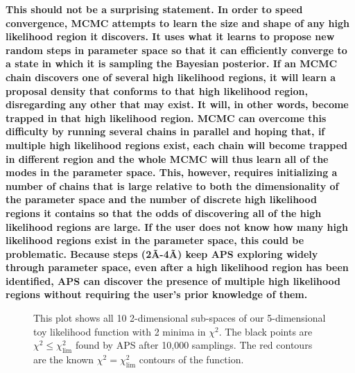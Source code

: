 \documentclass[useAMS,usenatbib]{aastex}
\begin{document}
{\bf %
This should not be a surprising statement.  In order to speed convergence,
MCMC attempts to learn the size and shape of any high likelihood region it discovers.
It uses what it learns to propose new random steps in parameter space so that it can
efficiently converge to a state in which it is sampling the Bayesian posterior.  If
an MCMC chain discovers one of several high likelihood regions, it will learn a proposal
density that conforms to that high likelihood region, disregarding any other that may
exist.  It will, in other words, become trapped in that high likelihood region.
MCMC can overcome this difficulty by running several chains in parallel and hoping that,
if multiple high likelihood regions exist, each chain will become trapped in different
region and the whole MCMC will thus learn all of the modes in the parameter space.
This, however, requires initializing a number of chains that is large relative to both
the dimensionality of the parameter space and the number of discrete high likelihood
regions it contains so that the odds of discovering all of the high likelihood regions
are large.  If the user does not know how many high likelihood regions exist in
the parameter space, this could be problematic.  Because steps (2\~A-4\~A) keep APS
exploring widely through parameter space, even after a high likelihood region has been
identified, APS can discover the presence of
multiple high likelihood regions without requiring the user's prior knowledge of them.
}%

\begin{figure*}
\caption{
This plot shows all 10 2-dimensional sub-spaces of our 5-dimensional toy likelihood
function with 2 minima in $\chi^2$.  The black points are $\chi^2\le\chi^2_\text{lim}$
found by APS after 10,000 samplings.  The red contours are the known $\chi^2=\chi^2_\text{lim}$
contours of the function.
}
\label{fig:toyFreq2}
\end{figure*}
\end{document}
